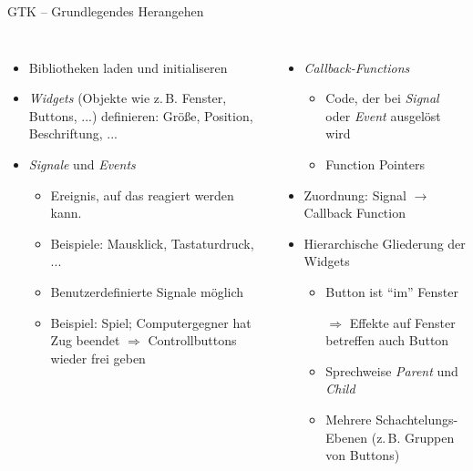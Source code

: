 \begin{frame}{GTK -- Grundlegendes Herangehen}
%
\begin{columns}[T]
\begin{itemize}
\item Bibliotheken laden und initialiseren
\item \emph{Widgets} (Objekte  wie z.\,B. Fenster, Buttons, ...) definieren: Größe, Position,
	Beschriftung, ...
\item \emph{Signale} und \emph{Events}
	\begin{itemize}
	\item Ereignis, auf das reagiert werden kann. 
	\item Beispiele: Mausklick, Tastaturdruck, ...
	\item Benutzerdefinierte Signale möglich
	\item Beispiel: Spiel; Computergegner hat Zug beendet $\Rightarrow$ Controllbuttons wieder frei geben
	\end{itemize}
\end{itemize}
%
\begin{itemize}
\item \emph{Callback-Functions}
	\begin{itemize}
	\item Code, der bei \emph{Signal} oder \emph{Event} ausgelöst wird
	\item Function Pointers
	\end{itemize}
\item Zuordnung: Signal $\rightarrow$ Callback Function
\item Hierarchische Gliederung der Widgets
	\begin{itemize}
	\item Button ist \enquote{im} Fenster
	\item[$\Rightarrow$] Effekte auf Fenster betreffen auch Button
	\item Sprechweise \emph{Parent} und \emph{Child}
	\item Mehrere Schachtelungs-Ebenen (z.\,B. Gruppen von Buttons)
	\end{itemize}
\end{itemize}
\end{columns}
%
\end{frame}


